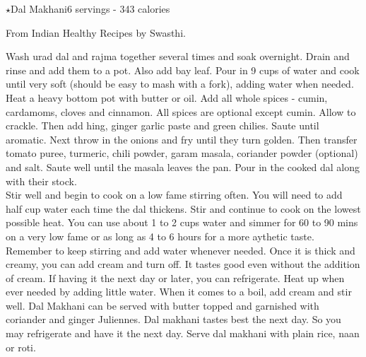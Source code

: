 \begin{recipe}{\texorpdfstring{$\star$}{str}Dal Makhani}{6 servings - 343 calories}{}

\freeform From Indian Healthy Recipes by Swasthi.


Wash urad dal and rajma together several times and soak overnight. Drain and rinse and add them to a pot. Also add bay leaf. Pour in 9 cups of water and cook until very soft (should be easy to mash with a fork), adding water when needed.\\

Heat a heavy bottom pot with butter or oil. Add all whole spices - cumin, cardamoms, cloves and cinnamon. All spices are optional except cumin. Allow to crackle. Then add hing, ginger garlic paste and green chilies. Saute until aromatic. Next throw in the onions and fry until they turn golden. Then transfer tomato puree, turmeric, chili powder, garam masala, coriander powder (optional) and salt. Saute well until the masala leaves the pan. Pour in the cooked dal along with their stock.\\

Stir well and begin to cook on a low fame stirring often. You will need to add half cup water each time the dal thickens. Stir and continue to cook on the lowest possible heat. You can use about 1 to 2 cups water and simmer for 60 to 90 mins on a very low fame or as long as 4 to 6 hours for a more aythetic taste. Remember to keep stirring and add water whenever needed. Once it is thick and creamy, you can add cream and turn off. It tastes good even without the addition of cream. If having it the next day or later, you can refrigerate. Heat up when ever needed by adding little water. When it comes to a boil, add cream and stir well. Dal Makhani can be served with butter topped and garnished with coriander and ginger Juliennes. Dal makhani tastes best the next day. So you may refrigerate and have it the next day. Serve dal makhani with plain rice, naan or roti.\\

\end{recipe}